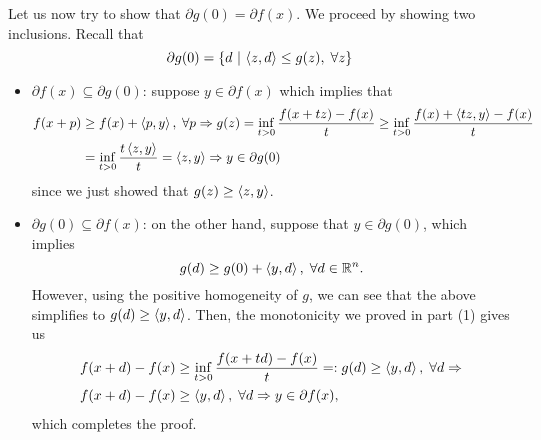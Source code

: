 \documentclass[10pt]{article}
\begin{document}
\begin{Exercise}
    Let us now try to show that $\partial g(0) = \partial f(x)$. We proceed by
    showing two inclusions. Recall that
    \[
        \partial g(0) = \left\{ d \ \middle| \  \left\langle z, d \right\rangle \leq g(z), \; \forall z \right\}
    \]
    \begin{itemize}
    \item $\partial f(x) \subseteq \partial g(0)$: suppose $y \in \partial f(x)$
        which implies that
        \begin{align*}
            f(x + p) &\geq f(x) + \left\langle p, y \right\rangle, \; \forall p \Rightarrow
            g(z) = \inf_{t > 0} \frac{f(x + tz) - f(x)}{t} \geq
                \inf_{t > 0} \frac{f(x) + \left\langle tz, y \right\rangle - f(x)}{t} \\
                &= \inf_{t > 0} \frac{t \left\langle z, y \right\rangle}{t} = \left\langle z, y \right\rangle
                \Rightarrow y \in \partial g(0)
        \end{align*}
        since we just showed that $g(z) \geq \left\langle z, y \right\rangle$.
    \item $\partial g(0) \subseteq \partial f(x)$: on the other hand, suppose
    that $y \in \partial g(0)$, which implies
    \[
        g(d) \geq g(0) + \left\langle y, d \right\rangle, \; \forall d \in \mathbb{R}^n.
    \]
    However, using the positive homogeneity of $g$, we can see that the above
    simplifies to $g(d) \geq \left\langle y, d \right\rangle$. Then, the monotonicity we proved in
    part (1) gives us
    \begin{align*}
        f(x + d) - f(x) &\geq \inf_{t > 0} \frac{f(x + td) - f(x)}{t}
            =: g(d) \geq \left\langle y, d \right\rangle, \; \forall d \Rightarrow \\
        f(x + d) - f(x) &\geq \left\langle y, d \right\rangle, \; \forall d \Rightarrow
            y \in \partial f(x),
    \end{align*}
    which completes the proof.
    \end{itemize}

    \ExePart


\end{Exercise}
\end{document}
